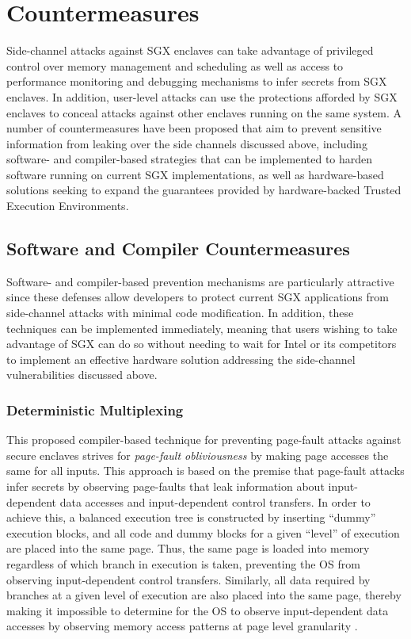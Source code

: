 \section{Countermeasures}

Side-channel attacks against SGX enclaves can take advantage of privileged control over memory management and scheduling as well as access to performance monitoring and debugging mechanisms to infer secrets from SGX enclaves. In addition, user-level attacks can use the protections afforded by SGX enclaves to conceal attacks against other enclaves running on the same system. A number of countermeasures have been proposed that aim to prevent sensitive information from leaking over the side channels discussed above, including software- and compiler-based strategies that can be implemented to harden software running on current SGX implementations, as well as hardware-based solutions seeking to expand the guarantees provided by hardware-backed Trusted Execution Environments.

\subsection{Software and Compiler Countermeasures}

Software- and compiler-based prevention mechanisms are particularly attractive since these defenses allow developers to protect current SGX applications from side-channel attacks with minimal code modification. In addition, these techniques can be implemented immediately, meaning that users wishing to take advantage of SGX can do so without needing to wait for Intel or its competitors to implement an effective hardware solution addressing the side-channel vulnerabilities discussed above.

\subsubsection{Deterministic Multiplexing}

This proposed compiler-based technique for preventing page-fault attacks against secure enclaves strives for \emph{page-fault obliviousness} by making page accesses the same for all inputs. This approach is based on the premise that page-fault attacks infer secrets by observing page-faults that leak information about input-dependent data accesses and input-dependent control transfers. In order to achieve this, a balanced execution tree is constructed by inserting ``dummy'' execution blocks, and all code and dummy blocks for a given ``level'' of execution are placed into the same page. Thus, the same page is loaded into memory regardless of which branch in execution is taken, preventing the OS from observing input-dependent control transfers. Similarly, all data required by branches at a given level of execution are also placed into the same page, thereby making it impossible to determine for the OS to observe input-dependent data accesses by observing memory access patterns at page level granularity \cite{shinde_preventing_2015}. 

